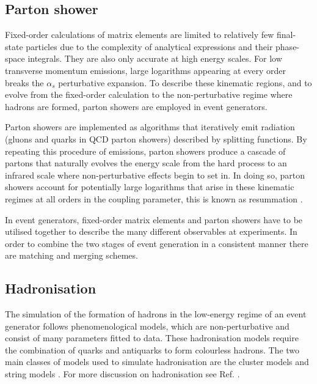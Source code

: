 \documentclass[main.tex]{subfiles}
\begin{document}
    \subsection*{Parton shower}\label{sec:parton_showers}
    Fixed-order calculations of matrix elements are limited
    to relatively few final-state particles due to the complexity
    of analytical expressions and their phase-space integrals.
    They are also only accurate at high energy scales. For low
    transverse momentum emissions, large logarithms appearing at
    every order breaks the $\alpha_{s}$ perturbative expansion.
    To describe these kinematic regions, and to evolve from the fixed-order
    calculation to the non-perturbative regime where hadrons
    are formed, parton showers are employed in event generators.

    Parton showers are implemented as algorithms that
    iteratively emit radiation (gluons and quarks in QCD
    parton showers) described by splitting functions.
    By repeating this procedure of emissions, parton
    showers produce a cascade of partons that naturally
    evolves the energy scale from the hard process to
    an infrared scale where non-perturbative effects
    begin to set in. In doing so, parton showers account
    for potentially large logarithms that arise in
    these kinematic regimes at all orders in the coupling
    parameter, this is known as resummation \cite{Buckley:2011ms}.

    In event generators, fixed-order matrix elements
    and parton showers have to be utilised together to describe
    the many different observables at experiments. In order
    to combine the two stages of event generation in a consistent
    manner there are matching \cite{Frixione:2002ik,Frixione:2007vw,Jadach:2015mza}
    and merging \cite{Catani:2001cc,Lonnblad:2011xx}
    schemes.

    \subsection*{Hadronisation}\label{sec:hadronisation}
    The simulation of the formation of hadrons in the low-energy regime
    of an event generator follows phenomenological models,
    which are non-perturbative and consist of many
    parameters fitted to data.
    These hadronisation models require the combination
    of quarks and antiquarks to form colourless hadrons.
    The two main classes of models used to simulate
    hadronisation are the cluster models \cite{Webber:1983if,Winter:2003tt}
    and string models \cite{Andersson:1983ia}.
    For more discussion on hadronisation
    see Ref. \cite{Webber:1999ui}.
\end{document}
